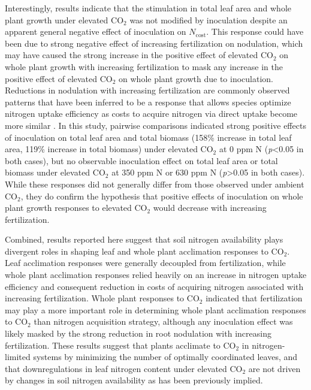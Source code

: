 Interestingly, results indicate that the stimulation in total leaf area and whole plant growth under elevated CO$_2$ was not modified by inoculation despite an apparent general negative effect of inoculation on $N_\mathrm{cost}$. This response could have been due to strong negative effect of increasing fertilization on nodulation, which may have caused the strong increase in the positive effect of elevated CO$_2$ on whole plant growth with increasing fertilization to mask any increase in the positive effect of elevated CO$_2$ on whole plant growth due to inoculation. Reductions in nodulation with increasing fertilization are commonly observed patterns that have been inferred to be a response that allows species optimize nitrogen uptake efficiency as costs to acquire nitrogen via direct uptake become more similar . In this study, pairwise comparisons indicated strong positive effects of inoculation on total leaf area and total biomass (158\% increase in total leaf area, 119\% increase in total biomass) under elevated CO$_2$ at 0 ppm N (\textit{p}<0.05 in both cases), but no observable inoculation effect on total leaf area or total biomass under elevated CO$_2$ at 350 ppm N or 630 ppm N (\textit{p}>0.05 in both cases). While these responses did not generally differ from those observed under ambient CO$_2$, they do confirm the hypothesis that positive effects of inoculation on whole plant growth responses to elevated CO$_2$ would decrease with increasing fertilization.

Combined, results reported here suggest that soil nitrogen availability plays divergent roles in shaping leaf and whole plant acclimation responses to CO$_2$. Leaf acclimation responses were generally decoupled from fertilization, while whole plant acclimation responses relied heavily on an increase in nitrogen uptake efficiency and consequent reduction in costs of acquiring nitrogen associated with increasing fertilization. Whole plant responses to CO$_2$ indicated that fertilization may play a more important role in determining whole plant acclimation responses to CO$_2$ than nitrogen acquisition strategy, although any inoculation effect was likely masked by the strong reduction in root nodulation with increasing fertilization. These results suggest that plants acclimate to CO$_2$ in nitrogen-limited systems by minimizing the number of optimally coordinated leaves, and that downregulations in leaf nitrogen content under elevated CO$_2$ are not driven by changes in soil nitrogen availability as has been previously implied.

